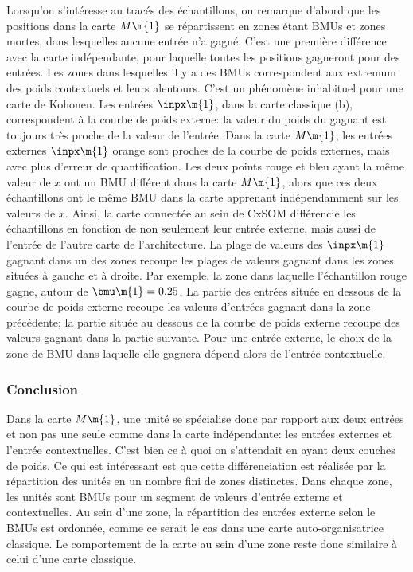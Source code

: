 Lorsqu'on s'intéresse au tracés des échantillons, on remarque d'abord que les positions dans la carte $M\m{1}$ se répartissent en zones étant BMUs et zones mortes, dans lesquelles aucune entrée n'a gagné. C'est une première différence avec la carte indépendante, pour laquelle toutes les positions gagneront pour des entrées. Les zones dans lesquelles il y a des BMUs correspondent aux extremum des poids contextuels et leurs alentours. C'est un phénomène inhabituel pour une carte de Kohonen. Les entrées $\inpx\m{1}$, dans la carte classique (b), correspondent à la courbe de poids externe: la valeur du poids du gagnant est toujours très proche de la valeur de l'entrée. Dans la carte $M\m{1}$, les entrées externes $\inpx\m{1}$ orange sont proches de la courbe de poids externes, mais avec plus d'erreur de quantification.
Les deux points rouge et bleu ayant la même valeur de $x$ ont un BMU différent dans la carte $M\m{1}$, alors que ces deux échantillons ont le même BMU dans la carte apprenant indépendamment sur les valeurs de $x$. Ainsi, la carte connectée au sein de CxSOM différencie les échantillons en fonction de non seulement leur entrée externe, mais aussi de l'entrée de l'autre carte de l'architecture. La plage de valeurs des $\inpx\m{1}$ gagnant dans un des zones recoupe les plages de valeurs gagnant dans les zones situées à gauche et à droite. Par exemple, la zone dans laquelle l'échantillon rouge gagne, autour de $\bmu\m{1} = 0.25$. La partie des entrées située en dessous de la courbe de poids externe recoupe les valeurs d'entrées gagnant dans la zone précédente; la partie située au dessous de la courbe de poids externe recoupe des valeurs gagnant dans la partie suivante. Pour une entrée externe, le choix de la zone de BMU dans laquelle elle gagnera dépend alors de l'entrée contextuelle. 

\subsubsection{Conclusion}

Dans la carte $M\m{1}$, une unité se spécialise donc par rapport aux deux entrées et non pas une seule comme dans la carte indépendante: les entrées externes et l'entrée contextuelles. C'est bien ce à quoi on s'attendait en ayant deux couches de poids. Ce qui est intéressant est que cette différenciation est réalisée par la répartition des unités en un nombre fini de zones distinctes. Dans chaque zone, les unités sont BMUs pour un segment de valeurs d'entrée externe et contextuelles. Au sein d'une zone, la répartition des entrées externe selon le BMUs est ordonnée, comme ce serait le cas dans une carte auto-organisatrice classique. Le comportement de la carte au sein d'une zone reste donc similaire à celui d'une carte classique.

